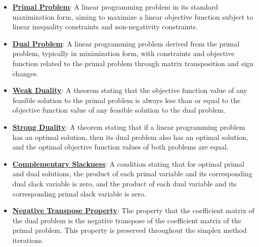 \documentclass{article}%
\begin{document}
\begin{itemize}[leftmargin=*]%
\item \href{https://www.math.purdue.edu/~yipn/421/2024-09-12-Duality.pdf#page=1}{\textbf{Primal Problem}}: A linear programming problem in its standard maximization form, aiming to maximize a linear objective function subject to linear inequality constraints and non-negativity constraints.%
\item \href{https://www.math.purdue.edu/~yipn/421/2024-09-12-Duality.pdf#page=1}{\textbf{Dual Problem}}: A linear programming problem derived from the primal problem, typically in minimization form, with constraints and objective function related to the primal problem through matrix transposition and sign changes.%
\item \href{https://www.math.purdue.edu/~yipn/421/2024-09-12-Duality.pdf#page=2}{\textbf{Weak Duality}}: A theorem stating that the objective function value of any feasible solution to the primal problem is always less than or equal to the objective function value of any feasible solution to the dual problem.%
\item \href{https://www.math.purdue.edu/~yipn/421/2024-09-12-Duality.pdf#page=11}{\textbf{Strong Duality}}: A theorem stating that if a linear programming problem has an optimal solution, then its dual problem also has an optimal solution, and the optimal objective function values of both problems are equal.%
\item \href{https://www.math.purdue.edu/~yipn/421/2024-09-12-Duality.pdf#page=5}{\textbf{Complementary Slackness}}: A condition stating that for optimal primal and dual solutions, the product of each primal variable and its corresponding dual slack variable is zero, and the product of each dual variable and its corresponding primal slack variable is zero.%
\item \href{https://www.math.purdue.edu/~yipn/421/2024-09-12-Duality.pdf#page=6}{\textbf{Negative Transpose Property}}: The property that the coefficient matrix of the dual problem is the negative transpose of the coefficient matrix of the primal problem. This property is preserved throughout the simplex method iterations.%
\end{itemize}%
\end{document}
